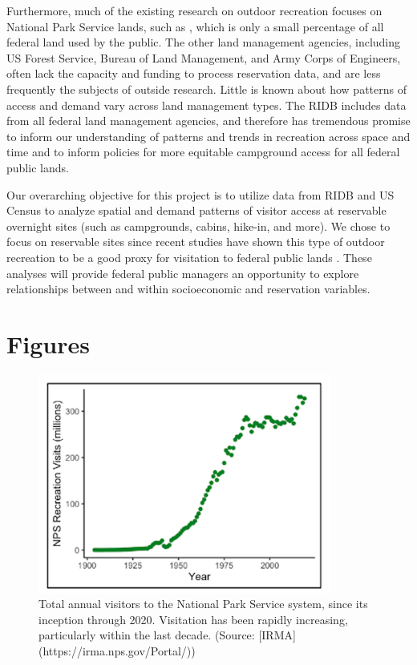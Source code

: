 \documentclass[
  11 pt,
  openany]{book}
\begin{document}
Furthermore, much of the existing research on outdoor recreation focuses on National Park Service lands, such as \citet{Walls2018}, which is only a small percentage of all federal land used by the public. The other land management agencies, including US Forest Service, Bureau of Land Management, and Army Corps of Engineers, often lack the capacity and funding to process reservation data, and are less frequently the subjects of outside research. Little is known about how patterns of access and demand vary across land management types. The RIDB includes data from all federal land management agencies, and therefore has tremendous promise to inform our understanding of patterns and trends in recreation across space and time and to inform policies for more equitable campground access for all federal public lands.

Our overarching objective for this project is to utilize data from RIDB and US Census to analyze spatial and demand patterns of visitor access at reservable overnight sites (such as campgrounds, cabins, hike-in, and more). We chose to focus on reservable sites since recent studies have shown this type of outdoor recreation to be a good proxy for visitation to federal public lands \citep{Walls2018}. These analyses will provide federal public managers an opportunity to explore relationships between and within socioeconomic and reservation variables.

\hypertarget{figures}{%
\section{Figures}\label{figures}}

\begin{figure}
\includegraphics[width=3.79in]{images/problem_statement_figure_1} \caption{Total annual visitors to the National Park Service system, since its inception through 2020. Visitation has been rapidly increasing, particularly within the last decade. (Source: [IRMA](https://irma.nps.gov/Portal/))}\label{fig:fig1}
\end{figure}
\end{document}
